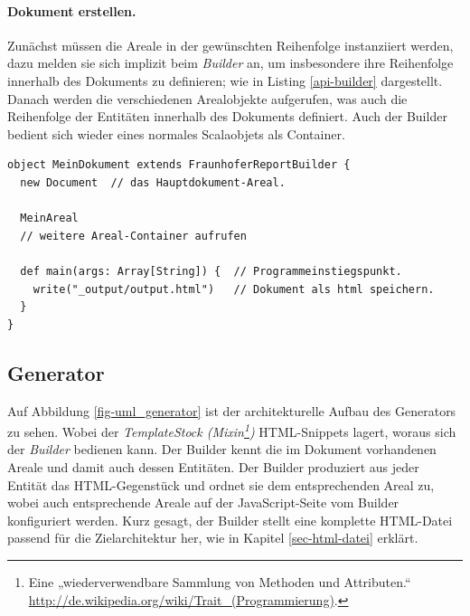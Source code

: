 \paragraph{Dokument erstellen.} Zunächst müssen die Areale in der gewünschten
Reihenfolge instanziiert werden, dazu melden sie sich implizit beim
\emph{Builder} an, um insbesondere ihre Reihenfolge innerhalb des Dokuments zu
definieren; wie in Listing \ref{api-builder} dargestellt.
Danach werden die verschiedenen Arealobjekte
aufgerufen, was auch die Reihenfolge der Entitäten innerhalb des Dokuments
definiert.
Auch der Builder bedient sich wieder eines normales Scalaobjets als Container.

\begin{lstlisting}[label=api-builder,caption=Dokument erstellen.]
object MeinDokument extends FraunhoferReportBuilder {
  new Document  // das Hauptdokument-Areal.

  MeinAreal
  // weitere Areal-Container aufrufen

  def main(args: Array[String]) {  // Programmeinstiegspunkt.
    write("_output/output.html")   // Dokument als html speichern.
  }
}
\end{lstlisting}


\subsection{Generator}\label{sec-archi-generator}

Auf Abbildung \ref{fig-uml_generator} ist der architekturelle Aufbau
des Generators zu sehen. Wobei der \emph{TemplateStock (Mixin\footnote{
Eine „wiederverwendbare Sammlung von Methoden und Attributen.“
\url{http://de.wikipedia.org/wiki/Trait_(Programmierung)}.
})}
HTML-Snippets lagert, woraus sich der \emph{Builder} bedienen kann.
Der Builder kennt die im Dokument vorhandenen Areale und damit auch dessen
Entitäten. Der Builder produziert aus jeder Entität das HTML-Gegenstück
und ordnet sie dem entsprechenden Areal zu, wobei auch entsprechende
Areale auf der JavaScript-Seite vom Builder konfiguriert werden.
Kurz gesagt, der Builder stellt eine komplette HTML-Datei passend für die
Zielarchitektur her, wie in Kapitel \ref{sec-html-datei} erklärt.

